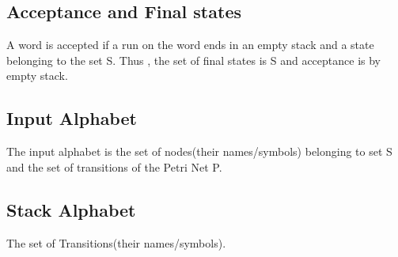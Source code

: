 \documentclass[a4paper,10pt]{article}
\begin{document}
   \subsection{Acceptance and Final states}
     A word is accepted if a run on the word ends in an empty stack and a state belonging to the set S.
     Thus , the set of final states is S and acceptance is by empty stack.
     
   \subsection{Input Alphabet}
     The input alphabet is the set of nodes(their names/symbols) belonging to set S and the set of transitions of the Petri Net P.
   
   \subsection{Stack Alphabet}
     The set of Transitions(their names/symbols).
     
   
\end{document}
